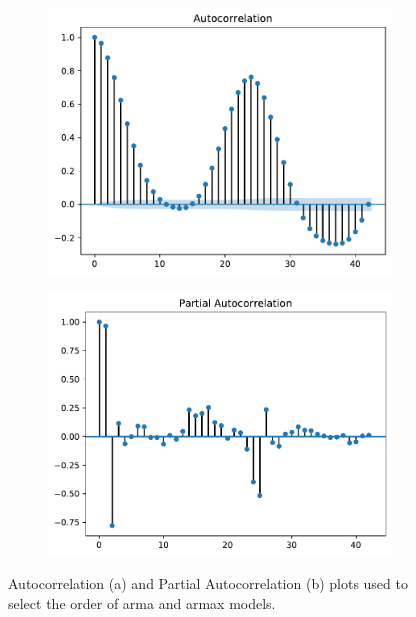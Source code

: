 \begin{figure}[h!]%
	\centering
	\begin{subfigure}{.5\textwidth}
		\centering
		\includegraphics[width=\textwidth]{plots/ACF/load_42lags_ndiff0_hstep1}%
		\caption{}
		\label{fig:acf_load_lags42}%
	\end{subfigure}%
	\begin{subfigure}{.5\textwidth}
		\centering
		\includegraphics[width=\textwidth]{plots/PACF/load_42lags_ndiff0_hstep1}%
		\caption{}
		\label{fig:pacf_load_lags42}%
	\end{subfigure}
	\caption{Autocorrelation (a) and Partial Autocorrelation (b) plots used to select the order of \acrshort{arma} and \acrshort{armax} models.}
	\label{fig:acf_compare}
\end{figure}


